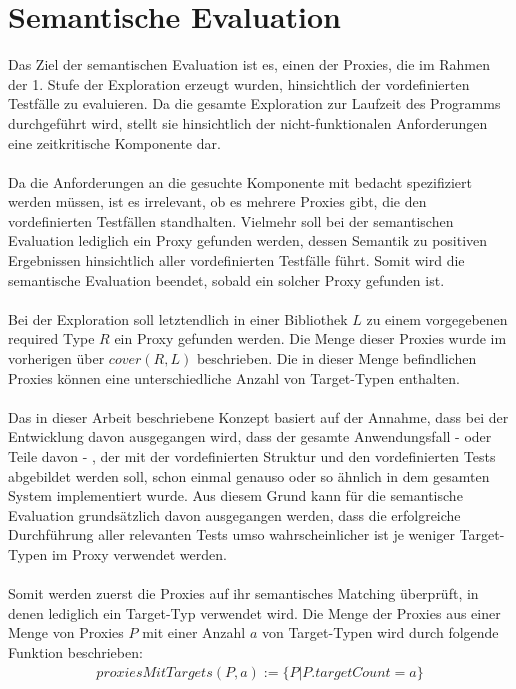 \documentclass[a4paper,12pt]{article}
\begin{document}
\section{Semantische Evaluation}
Das Ziel der semantischen Evaluation ist es, einen der Proxies, die im Rahmen der 1. Stufe der Exploration erzeugt wurden, hinsichtlich der vordefinierten Testfälle zu evaluieren. Da die gesamte Exploration zur Laufzeit des Programms durchgeführt wird, stellt sie hinsichtlich der nicht-funktionalen Anforderungen eine zeitkritische Komponente dar.\\\\
Da die Anforderungen an die gesuchte Komponente mit bedacht spezifiziert werden müssen, ist es irrelevant, ob es mehrere Proxies gibt, die den vordefinierten Testfällen standhalten. Vielmehr soll bei der semantischen Evaluation lediglich ein Proxy gefunden werden, dessen Semantik zu positiven Ergebnissen hinsichtlich aller vordefinierten Testfälle führt. Somit wird die semantische Evaluation beendet, sobald ein solcher Proxy gefunden ist.\\\\
Bei der Exploration soll letztendlich in einer Bibliothek $L$ zu einem vorgegebenen required Type $R$ ein Proxy gefunden werden. Die Menge dieser Proxies wurde im vorherigen über $\mathit{cover(R,L)}$ beschrieben. Die in dieser Menge befindlichen Proxies können eine unterschiedliche Anzahl von Target-Typen enthalten.\\\\
Das in dieser Arbeit beschriebene Konzept basiert auf der Annahme, dass bei der Entwicklung davon ausgegangen wird, dass der gesamte Anwendungsfall - oder Teile davon - , der mit der vordefinierten Struktur und den vordefinierten Tests abgebildet werden soll, schon einmal genauso oder so ähnlich in dem gesamten System implementiert wurde. Aus diesem Grund kann für die semantische Evaluation grundsätzlich davon ausgegangen werden, dass die erfolgreiche Durchführung aller relevanten Tests umso wahrscheinlicher ist je weniger Target-Typen im Proxy verwendet werden.\\\\
Somit werden zuerst die Proxies auf ihr semantisches Matching überprüft, in denen lediglich ein Target-Typ verwendet wird. Die Menge der Proxies aus einer Menge von Proxies $P$ mit einer Anzahl $a$ von Target-Typen wird durch folgende Funktion beschrieben:
\begin{gather*}
proxiesMitTargets(P,a) := \{P | P.targetCount = a\}
\end{gather*}
\end{document}
